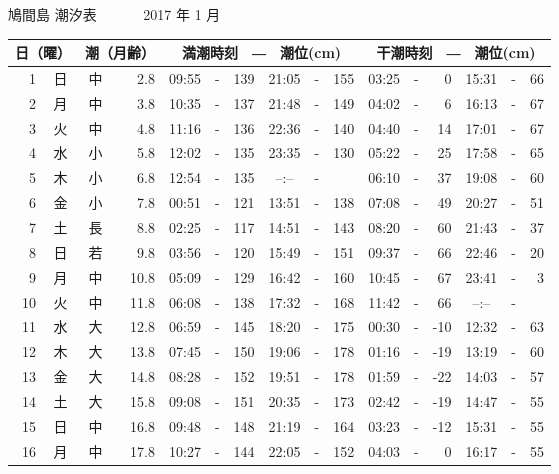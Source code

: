 \documentclass[12pt.a4j]{jsarticle}
\begin{document}
\pagestyle{empty}
 \begin{center}
 {\LARGE 鳩間島  潮汐表　　　}
 {\large 2017 年  1 月}\\
 \begin{table}[ht]
    \begin{tabular}{|rc|cr|ccrccr|ccrccr|}
    \hline
    \multicolumn{2}{|c|}{日（曜）} & \multicolumn{2}{c|}{潮（月齢）} & \multicolumn{6}{c|}{満潮時刻　―　潮位(cm)} & \multicolumn{6}{c|}{干潮時刻　―　潮位(cm)} \\
 \hline
 1 & 日 & 中 &  2.8 &  09:55 &-& 139  &  21:05 &-& 155  &   03:25 &-&   0  &   15:31 &-&  66  \\
 2 & 月 & 中 &  3.8 &  10:35 &-& 137  &  21:48 &-& 149  &   04:02 &-&   6  &   16:13 &-&  67  \\
 3 & 火 & 中 &  4.8 &  11:16 &-& 136  &  22:36 &-& 140  &   04:40 &-&  14  &   17:01 &-&  67  \\
 4 & 水 & 小 &  5.8 &  12:02 &-& 135  &  23:35 &-& 130  &   05:22 &-&  25  &   17:58 &-&  65  \\
 5 & 木 & 小 &  6.8 &  12:54 &-& 135  &  --:-- &-&     &   06:10 &-&  37  &   19:08 &-&  60  \\
 6 & 金 & 小 &  7.8 &  00:51 &-& 121  &  13:51 &-& 138  &   07:08 &-&  49  &   20:27 &-&  51  \\
 7 & 土 & 長 &  8.8 &  02:25 &-& 117  &  14:51 &-& 143  &   08:20 &-&  60  &   21:43 &-&  37  \\
 8 & 日 & 若 &  9.8 &  03:56 &-& 120  &  15:49 &-& 151  &   09:37 &-&  66  &   22:46 &-&  20  \\
 9 & 月 & 中 & 10.8 &  05:09 &-& 129  &  16:42 &-& 160  &   10:45 &-&  67  &   23:41 &-&   3  \\
10 & 火 & 中 & 11.8 &  06:08 &-& 138  &  17:32 &-& 168  &   11:42 &-&  66  &   --:-- &-&     \\
11 & 水 & 大 & 12.8 &  06:59 &-& 145  &  18:20 &-& 175  &   00:30 &-& -10  &   12:32 &-&  63  \\
12 & 木 & 大 & 13.8 &  07:45 &-& 150  &  19:06 &-& 178  &   01:16 &-& -19  &   13:19 &-&  60  \\
13 & 金 & 大 & 14.8 &  08:28 &-& 152  &  19:51 &-& 178  &   01:59 &-& -22  &   14:03 &-&  57  \\
14 & 土 & 大 & 15.8 &  09:08 &-& 151  &  20:35 &-& 173  &   02:42 &-& -19  &   14:47 &-&  55  \\
15 & 日 & 中 & 16.8 &  09:48 &-& 148  &  21:19 &-& 164  &   03:23 &-& -12  &   15:31 &-&  55  \\
16 & 月 & 中 & 17.8 &  10:27 &-& 144  &  22:05 &-& 152  &   04:03 &-&   0  &   16:17 &-&  55  \\

\end{tabular}
\end{table}
\end{center}
\end{document}
